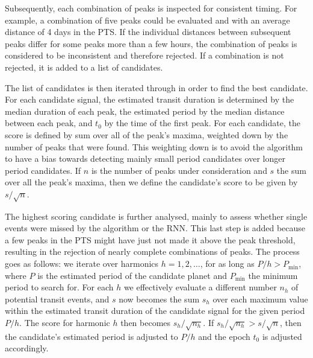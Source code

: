 Subsequently, each combination of peaks is inspected for consistent timing. For example, a combination of five peaks could be evaluated and with an average distance of 4 days in the PTS. If the individual distances between subsequent peaks differ for some peaks more than a few hours, the combination of peaks is considered to be inconsistent and therefore rejected. If a combination is not rejected, it is added to a list of candidates.

The list of candidates is then iterated through in order to find the best candidate. For each candidate signal, the estimated transit duration is determined by the median duration of each peak, the estimated period by the median distance between each peak, and $t_0$ by the time of the first peak. For each candidate, the score is defined by sum over all of the peak's maxima, weighted down by the number of peaks that were found. This weighting down is to avoid the algorithm to have a bias towards detecting mainly small period candidates over longer period candidates. If $n$ is the number of peaks under consideration and $s$ the sum over all the peak's maxima, then we define the candidate's score to be given by $s / \sqrt{n}$.

The highest scoring candidate is further analysed, mainly to assess whether single events were missed by the algorithm or the RNN. This last step is added because a few peaks in the PTS might have just not made it above the peak threshold, resulting in the rejection of nearly complete combinations of peaks. The process goes as follows: we iterate over harmonics $h = 1, 2, \dots$, for as long as $P/h > P_{\text{min}}$, where $P$ is the estimated period of the candidate planet and $P_{\text{min}}$ the minimum period to search for. For each $h$ we effectively evaluate a different number $n_h$ of potential transit events, and $s$ now becomes the sum $s_h$ over each maximum value within the estimated transit duration of the candidate signal for the given period $P/h$. The score for harmonic $h$ then becomes $s_h / \sqrt{n_h}$. If $s_h / \sqrt{n_h} > s / \sqrt{n}$, then the candidate's estimated period is adjusted to $P/h$ and the epoch $t_0$ is adjusted accordingly.

 

